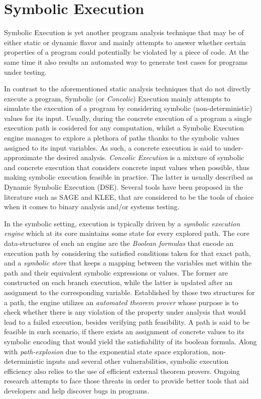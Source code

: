 \section{Symbolic Execution}

Symbolic Execution is yet another program analysis technique that
may be of either static or dynamic flavor and mainly attempts
to answer whether certain properties of a program could potentially
be violated by a piece of code\cite{baldoni2018survey}. At the same
time it also results an automated way to generate test cases for
programs under testing.

In contrast to the aforementioned static analysis techniques that
do not directly execute a program, Symbolic (or \textit{Concolic}) Execution
mainly attempts to simulate the execution of a
program by considering symbolic (non-deterministic) values for its input.
Usually, during the concrete execution of a program a single execution path is
cosidered for any computation, whilst a Symbolic Execution engine manages
to explore a plethora of paths thanks to the symbolic values assigned to
its input variables. As such, a concrete execution is said to under-approximate
the desired analysis. \textit{Concolic Execution} is a mixture of symbolic and concrete
execution that considers concrete input values when possible, thus making
symbolic execution feasible in practice. The latter is usually described
as Dynamic Symbolic Execution (DSE). Several tools have been proposed
in the literature such as SAGE\cite{godefroid2012sage} and KLEE\cite{cadar2008klee},
that are considered to be the tools of choice when it comes to
binary analysis and/or systems testing.

In the symbolic setting, execution is typically driven by a
\textit{symbolic execution engine} which at its core maintains some state
for every explored path. The core data-structures of such
an engine are the \textit{Boolean formulas} that encode an execution path by
considering the satisfied conditions taken for that exact path, and a
\textit{symbolic store} that keeps a mapping between the variables met within the path
and their equivalent symbolic expressions or values. The former are constructed
on each branch execution, while the latter is updated after an assignment to
the corresponding variable. Established by those two structures for a path,
the engine utilizes an \textit{automated theorem prover} whose purpose is to
check whether there is any violation of the property under analysis that
would lead to a failed execution, besides verifying path feasibility. A path
is said to be feasible in such scenario, if there exists an assignment of
concrete values to its symbolic encoding that would yield the satisfiability
of its boolean formula. Along with \textit{path-explosion} due to the exponential state
space exploration, non-deterministic inputs and several other vulnerabilities,
symbolic execution efficiency also relies to the use of efficient external
theorem provers. Ongoing research attempts to face those threats in order
to provide better tools that aid developers and help discover bugs in
programs.

